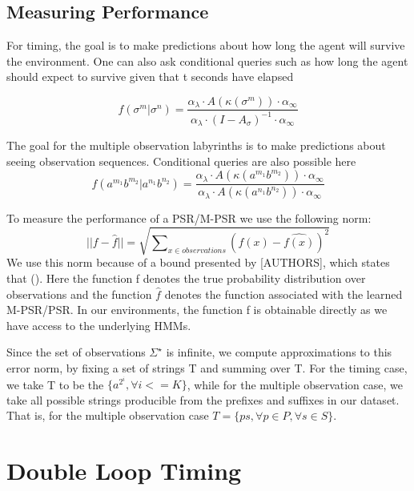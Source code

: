 \subsection{Measuring Performance}
For timing, the goal is to make predictions about how long the agent will survive the environment. One can also ask conditional queries such as how long the agent should expect to survive given that t seconds have elapsed

\begin{equation*}
f(\sigma^m|\sigma^n) = \dfrac{\alpha_{\lambda} \cdot A(\kappa(\sigma^m)) \cdot \alpha_\infty}{\alpha_\lambda \cdot (I-A_{\sigma})^{-1} \cdot \alpha_{\infty} }
\end{equation*}

The goal for the multiple observation labyrinths is to make predictions about seeing observation sequences. Conditional queries are also possible here 
\begin{equation*}
f(a^{m_1}b^{m_2}|a^{n_1}b^{n_2}) = \dfrac{\alpha_{\lambda} \cdot A(\kappa(a^{m_1}b^{m_2})) \cdot \alpha_\infty}{\alpha_\lambda \cdot A(\kappa(a^{n_1}b^{n_2})) \cdot \alpha_{\infty} }
\end{equation*}


To measure the performance of a PSR/M-PSR we use the following norm:
\begin{equation*}
||f - \hat{f}|| = \sqrt{\sum\nolimits_{x \in observations}(f(x) - \hat{f(x)})^2}
\end{equation*}
We use this norm because of a bound presented by [AUTHORS], which states that (). Here the function f denotes the true probability distribution over observations and the function $\hat{f}$ denotes the function associated with the learned M-PSR/PSR. In our environments, the function f is obtainable directly as we have access to the underlying HMMs.

Since the set of observations $\Sigma^{\star}$ is infinite, we compute approximations to this error norm, by fixing a set of strings T and summing over T. For the timing case, we take T to be the $\{a^{2^i}, \forall i<=K\}$, while for the multiple observation case, we take all possible strings producible from the prefixes and suffixes in our dataset. That is, for the multiple observation case $T = \{ps, \forall p \in P, \forall s \in S\}$.

\section{Double Loop Timing}

